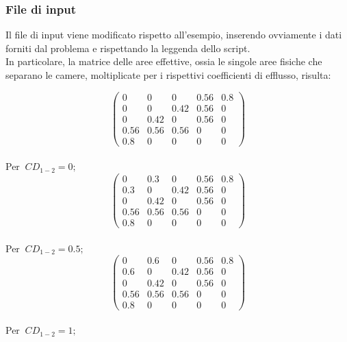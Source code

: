 \documentclass{article}
\begin{document}
        \subsubsection{File di input}

        Il file di input viene modificato rispetto all'esempio, 
        inserendo ovviamente i dati forniti dal problema e rispettando la leggenda
        dello script.\\ 
        In particolare, la matrice delle aree effettive, ossia le singole aree fisiche che separano le camere, moltiplicate
        per i rispettivi coefficienti di efflusso, risulta: \\
        \begin{center}  
            \[
            \begin{pmatrix}
                0    & 0    & 0        & 0.56 & 0.8\\ 
                0    & 0    & 0.42     & 0.56 & 0\\ 
                0    & 0.42 & 0        & 0.56 & 0\\ 
                0.56 & 0.56 & 0.56     & 0    & 0\\
                0.8  & 0    & 0        & 0    & 0 
            \end{pmatrix}
            \]
            \\ 
            Per $\ CD_{1-2} = 0;$ \
            \\ 
            \[
            \begin{pmatrix}
                0    & 0.3  & 0        & 0.56 & 0.8\\ 
                0.3  & 0    & 0.42     & 0.56 & 0\\ 
                0    & 0.42 & 0        & 0.56 & 0\\ 
                0.56 & 0.56 & 0.56     & 0    & 0\\
                0.8  & 0    & 0        & 0    & 0 
            \end{pmatrix}
            \]
            \\ 
            Per $\ CD_{1-2} = 0.5;$ \
            \\ 
            \[
            \begin{pmatrix}
                0    & 0.6  & 0        & 0.56 & 0.8\\ 
                0.6  & 0    & 0.42     & 0.56 & 0\\ 
                0    & 0.42 & 0        & 0.56 & 0\\ 
                0.56 & 0.56 & 0.56     & 0    & 0\\
                0.8  & 0    & 0        & 0    & 0 
            \end{pmatrix}
            \]
            \\ 
            Per $\ CD_{1-2} = 1;$ \
        \end{center}    
        \pagebreak
\end{document}
